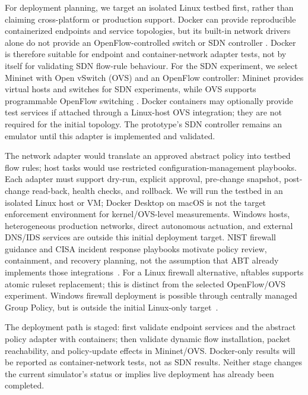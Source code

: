 \documentclass[conference]{IEEEtran}
\begin{document}
For deployment planning, we target an isolated Linux testbed first, rather than
claiming cross-platform or production support. Docker can provide reproducible
containerized endpoints and service topologies, but its built-in network drivers
alone do not provide an OpenFlow-controlled switch or SDN controller
\cite{dockernetworking}. Docker is therefore suitable for endpoint and
container-network adapter tests, not by itself for validating SDN flow-rule
behaviour. For the SDN experiment, we select Mininet with Open vSwitch (OVS) and an
OpenFlow controller: Mininet provides virtual hosts and switches for SDN
experiments, while OVS supports programmable OpenFlow switching
\cite{mininet,openvswitch}. Docker containers may optionally provide test services
if attached through a Linux-host OVS integration; they are not required for the
initial topology. The prototype's SDN controller remains an emulator until this
adapter is implemented and validated.

The network adapter would translate an approved abstract policy into testbed flow
rules; host tasks would use restricted configuration-management playbooks. Each
adapter must support dry-run, explicit approval, pre-change snapshot, post-change
read-back, health checks, and rollback. We will run the testbed in an isolated
Linux host or VM; Docker Desktop on macOS is not the target enforcement environment
for kernel/OVS-level measurements. Windows hosts, heterogeneous production
networks, direct autonomous actuation, and external DNS/IDS services are outside
this initial deployment target. NIST firewall guidance and CISA incident response playbooks motivate policy review,
containment, and recovery planning, not the assumption that ABT already implements
those integrations~\cite{nist80041r1,cisairplaybook}. For a Linux firewall
alternative, nftables supports atomic ruleset replacement; this is distinct from
the selected OpenFlow/OVS experiment. Windows firewall deployment is possible
through centrally managed Group Policy, but is outside the initial Linux-only
target~\cite{nftablesatomic,windowsfirewallgpo}.

The deployment path is staged: first validate endpoint services and the abstract
policy adapter with containers; then validate dynamic flow installation, packet
reachability, and policy-update effects in Mininet/OVS. Docker-only results will be
reported as container-network tests, not as SDN results. Neither stage changes the
current simulator's status or implies live deployment has already been completed.
\end{document}
